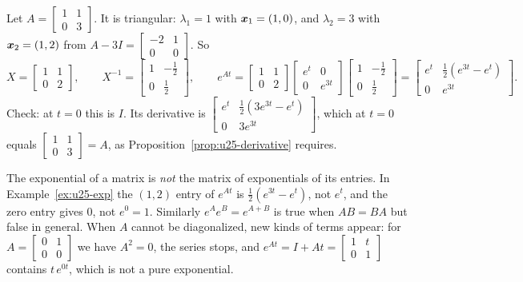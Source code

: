 \begin{example}[Computing $e^{At}$]\label{ex:u25-exp}
Let $A=\begin{bmatrix} 1&1\\ 0&3\end{bmatrix}$. It is triangular: $\lambda_1=1$ with
$\boldsymbol{x}_1=(1,0)$, and $\lambda_2=3$ with $\boldsymbol{x}_2=(1,2)$ from
$A-3I=\left[\begin{smallmatrix} -2&1\\ 0&0\end{smallmatrix}\right]$. So
\[
  X=\begin{bmatrix} 1&1\\ 0&2\end{bmatrix},\qquad
  X^{-1}=\begin{bmatrix} 1&-\tfrac12\\ 0&\tfrac12\end{bmatrix},\qquad
  e^{At}=\begin{bmatrix} 1&1\\ 0&2\end{bmatrix}
  \begin{bmatrix} e^{t}&0\\ 0&e^{3t}\end{bmatrix}
  \begin{bmatrix} 1&-\tfrac12\\ 0&\tfrac12\end{bmatrix}
  =\begin{bmatrix} e^{t} & \tfrac12(e^{3t}-e^{t})\\ 0 & e^{3t}\end{bmatrix}.
\]
Check: at $t=0$ this is $I$. Its derivative is
$\left[\begin{smallmatrix} e^{t} & \frac12(3e^{3t}-e^{t})\\ 0 & 3e^{3t}\end{smallmatrix}\right]$,
which at $t=0$ equals $\left[\begin{smallmatrix} 1&1\\ 0&3\end{smallmatrix}\right]=A$, as
Proposition~\ref{prop:u25-derivative} requires.
\end{example}

\begin{trap}
The exponential of a matrix is \emph{not} the matrix of exponentials of its entries. In
Example~\ref{ex:u25-exp} the $(1,2)$ entry of $e^{At}$ is $\tfrac12(e^{3t}-e^{t})$, not
$e^{t}$, and the zero entry gives $0$, not $e^{0}=1$. Similarly $e^{A}e^{B}=e^{A+B}$ is true
when $AB=BA$ but false in general. When $A$ cannot be diagonalized, new kinds of terms
appear: for $A=\left[\begin{smallmatrix} 0&1\\ 0&0\end{smallmatrix}\right]$ we have $A^{2}=0$,
the series stops, and $e^{At}=I+At=\left[\begin{smallmatrix} 1&t\\ 0&1\end{smallmatrix}\right]$
contains $t\,e^{0t}$, which is not a pure exponential.
\end{trap}

